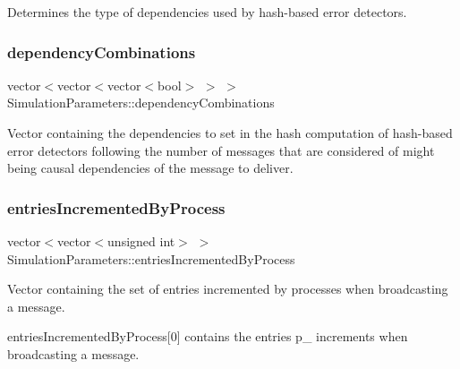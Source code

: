 Determines the type of dependencies used by hash-\/based error detectors. 

\mbox{\label{class_simulation_parameters_a1e884901020cad738db1aceaa6700d9f}} 
\subsubsection{\texorpdfstring{dependency\+Combinations}{dependencyCombinations}}
{\footnotesize\ttfamily vector$<$vector$<$vector$<$bool$>$ $>$ $>$ Simulation\+Parameters\+::dependency\+Combinations}



Vector containing the dependencies to set in the hash computation of hash-\/based error detectors following the number of messages that are considered of might being causal dependencies of the message to deliver. 

\mbox{\label{class_simulation_parameters_a069a04754400916fc6b5f9f5baff2d32}} 
\subsubsection{\texorpdfstring{entries\+Incremented\+By\+Process}{entriesIncrementedByProcess}}
{\footnotesize\ttfamily vector$<$vector$<$unsigned int$>$ $>$ Simulation\+Parameters\+::entries\+Incremented\+By\+Process}



Vector containing the set of entries incremented by processes when broadcasting a message. 

entries\+Incremented\+By\+Process\mbox{[}0\mbox{]} contains the entries p\+\_ increments when broadcasting a message. \mbox{\label{class_simulation_parameters_a96391a1b611de11ca4d0babba7117872}} 
